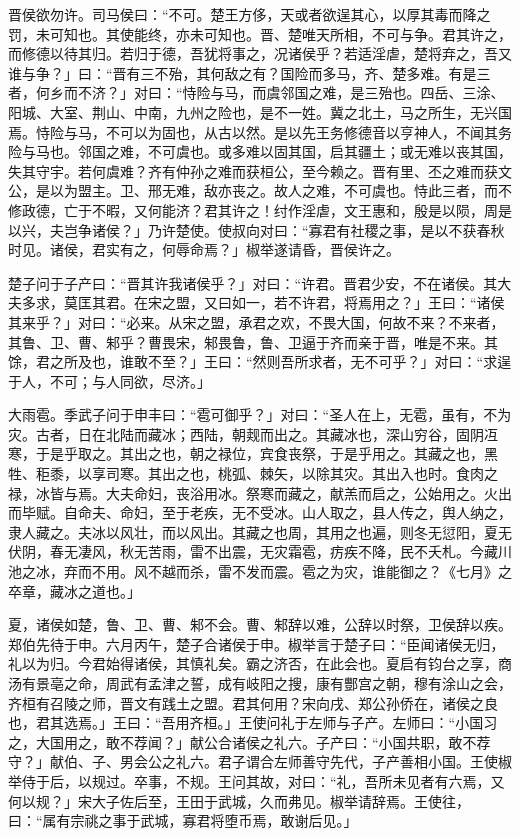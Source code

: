 \documentclass[]{article}
\begin{document}
晋侯欲勿许。司马侯曰：``不可。楚王方侈，天或者欲逞其心，以厚其毒而降之罚，未可知也。其使能终，亦未可知也。晋、楚唯天所相，不可与争。君其许之，而修德以待其归。若归于德，吾犹将事之，况诸侯乎？若适淫虐，楚将弃之，吾又谁与争？」曰：``晋有三不殆，其何敌之有？国险而多马，齐、楚多难。有是三者，何乡而不济？」对曰：``恃险与马，而虞邻国之难，是三殆也。四岳、三涂、阳城、大室、荆山、中南，九州之险也，是不一姓。冀之北土，马之所生，无兴国焉。恃险与马，不可以为固也，从古以然。是以先王务修德音以亨神人，不闻其务险与马也。邻国之难，不可虞也。或多难以固其国，启其疆土；或无难以丧其国，失其守宇。若何虞难？齐有仲孙之难而获桓公，至今赖之。晋有里、丕之难而获文公，是以为盟主。卫、邢无难，敌亦丧之。故人之难，不可虞也。恃此三者，而不修政德，亡于不暇，又何能济？君其许之！纣作淫虐，文王惠和，殷是以陨，周是以兴，夫岂争诸侯？」乃许楚使。使叔向对曰：``寡君有社稷之事，是以不获春秋时见。诸侯，君实有之，何辱命焉？」椒举遂请昏，晋侯许之。

楚子问于子产曰：``晋其许我诸侯乎？」对曰：``许君。晋君少安，不在诸侯。其大夫多求，莫匡其君。在宋之盟，又曰如一，若不许君，将焉用之？」王曰：``诸侯其来乎？」对曰：``必来。从宋之盟，承君之欢，不畏大国，何故不来？不来者，其鲁、卫、曹、邾乎？曹畏宋，邾畏鲁，鲁、卫逼于齐而亲于晋，唯是不来。其馀，君之所及也，谁敢不至？」王曰：``然则吾所求者，无不可乎？」对曰：``求逞于人，不可；与人同欲，尽济。」

大雨雹。季武子问于申丰曰：``雹可御乎？」对曰：``圣人在上，无雹，虽有，不为灾。古者，日在北陆而藏冰；西陆，朝觌而出之。其藏冰也，深山穷谷，固阴冱寒，于是乎取之。其出之也，朝之禄位，宾食丧祭，于是乎用之。其藏之也，黑牲、秬黍，以享司寒。其出之也，桃弧、棘矢，以除其灾。其出入也时。食肉之禄，冰皆与焉。大夫命妇，丧浴用冰。祭寒而藏之，献羔而启之，公始用之。火出而毕赋。自命夫、命妇，至于老疾，无不受冰。山人取之，县人传之，舆人纳之，隶人藏之。夫冰以风壮，而以风出。其藏之也周，其用之也遍，则冬无愆阳，夏无伏阴，春无凄风，秋无苦雨，雷不出震，无灾霜雹，疠疾不降，民不夭札。今藏川池之冰，弃而不用。风不越而杀，雷不发而震。雹之为灾，谁能御之？《七月》之卒章，藏冰之道也。」

夏，诸侯如楚，鲁、卫、曹、邾不会。曹、邾辞以难，公辞以时祭，卫侯辞以疾。郑伯先待于申。六月丙午，楚子合诸侯于申。椒举言于楚子曰：``臣闻诸侯无归，礼以为归。今君始得诸侯，其慎礼矣。霸之济否，在此会也。夏启有钧台之享，商汤有景亳之命，周武有孟津之誓，成有岐阳之搜，康有酆宫之朝，穆有涂山之会，齐桓有召陵之师，晋文有践土之盟。君其何用？宋向戌、郑公孙侨在，诸侯之良也，君其选焉。」王曰：``吾用齐桓。」王使问礼于左师与子产。左师曰：``小国习之，大国用之，敢不荐闻？」献公合诸侯之礼六。子产曰：``小国共职，敢不荐守？」献伯、子、男会公之礼六。君子谓合左师善守先代，子产善相小国。王使椒举侍于后，以规过。卒事，不规。王问其故，对曰：``礼，吾所未见者有六焉，又何以规？」宋大子佐后至，王田于武城，久而弗见。椒举请辞焉。王使往，曰：``属有宗祧之事于武城，寡君将堕币焉，敢谢后见。」
\end{document}
